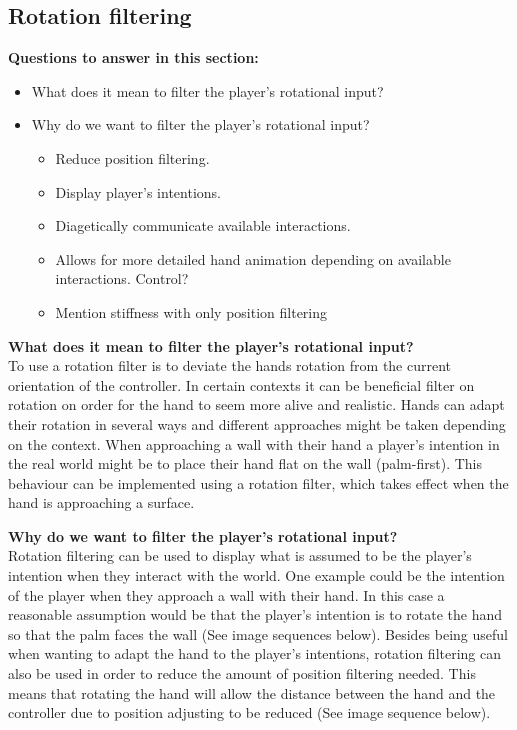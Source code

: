 \subsection{Rotation filtering}
\label{subsec:categoryRotationFiltering}
\textbf{Questions to answer in this section:}
\begin{itemize}
\setlength\itemsep{-0.1cm}
\item What does it mean to filter the player's rotational input?
\item Why do we want to filter the player's rotational input?
\begin{itemize}
\setlength\itemsep{-0.1cm}
\item Reduce position filtering.
\item Display player's intentions.
\item Diagetically communicate available interactions.
\item Allows for more detailed hand animation depending on available interactions. Control?
\item Mention stiffness with only position filtering
\end{itemize}
\end{itemize}

\textbf{What does it mean to filter the player's rotational input?}\\
To use a rotation filter is to deviate the hands rotation from the current orientation of the controller. In certain contexts it can be beneficial filter on rotation on order for the hand to seem more alive and realistic. Hands can adapt their rotation in several ways and different approaches might be taken depending on the context. When approaching a wall with their hand a player's intention in the real world might be to place their hand flat on the wall (palm-first). This behaviour can be implemented using a rotation filter, which takes effect when the hand is approaching a surface.

\textbf{Why do we want to filter the player's rotational input?}\\
Rotation filtering can be used to display what is assumed to be the player's intention when they interact with the world. One example could be the intention of the player when they approach a wall with their hand. In this case a reasonable assumption would be that the player's intention is to rotate the hand so that the palm faces the wall (See image sequences below). Besides being useful when wanting to adapt the hand to the player's intentions, rotation filtering can also be used in order to reduce the amount of position filtering needed. This means that rotating the hand will allow the distance between the hand and the controller due to position adjusting to be reduced (See image sequence below).

